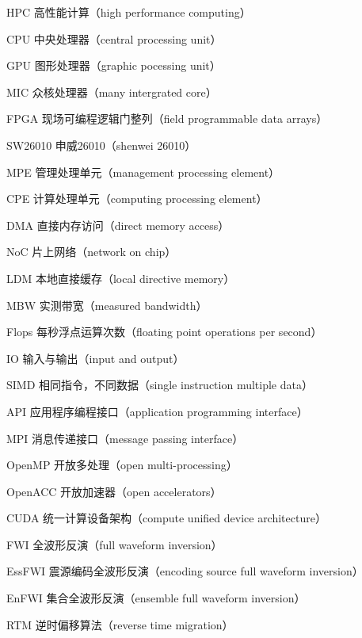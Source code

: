 \begin{denotation}
\item[HPC] 高性能计算（high performance computing）
\item[CPU] 中央处理器（central processing unit）
\item[GPU] 图形处理器（graphic pocessing unit）
\item[MIC] 众核处理器（many intergrated core）
\item[FPGA] 现场可编程逻辑门整列（field programmable data arrays）
\item[SW26010] 申威26010（shenwei 26010）
\item[MPE] 管理处理单元（management processing element）
\item[CPE] 计算处理单元（computing processing element）
\item[DMA] 直接内存访问（direct memory access）
\item[NoC] 片上网络（network on chip）
\item[LDM] 本地直接缓存（local directive memory）
\item[MBW] 实测带宽（measured bandwidth）
\item[Flops] 每秒浮点运算次数（floating point operations per second）
\item[IO] 输入与输出（input and output）
\item[SIMD] 相同指令，不同数据（single instruction multiple data）
\item[API] 应用程序编程接口（application programming interface）
\item[MPI] 消息传递接口（message passing interface）
\item[OpenMP] 开放多处理（open multi-processing）
\item[OpenACC] 开放加速器（open accelerators）
\item[CUDA] 统一计算设备架构（compute unified device architecture）
\item[FWI] 全波形反演（full waveform inversion）
\item[EssFWI] 震源编码全波形反演（encoding source full waveform inversion）
\item[EnFWI] 集合全波形反演（ensemble full waveform inversion）
\item[RTM] 逆时偏移算法（reverse time migration）
\end{denotation}

